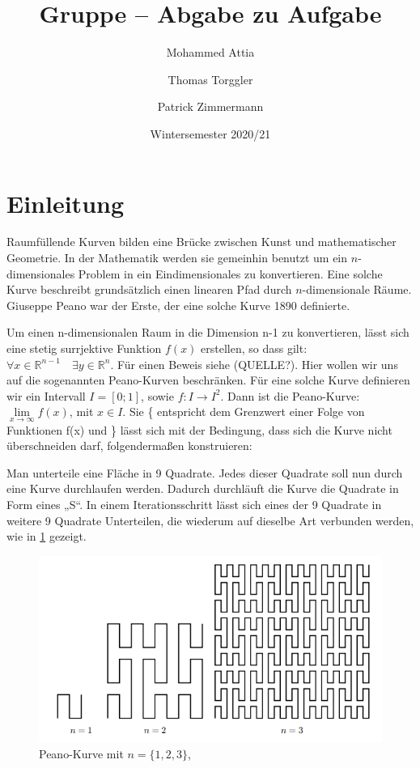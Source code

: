 \documentclass[course=asp]{aspdoc}
\author{Mohammed Attia \and Thomas Torggler \and Patrick Zimmermann}
\date{Wintersemester 2020/21} %
\title{Gruppe \theGroup{} -- Abgabe zu Aufgabe \theNumber}
\begin{document}
\maketitle

\newpage
\section{Einleitung} \label{Einleitung}

Raumf\"ullende Kurven bilden eine Br\"ucke zwischen Kunst und mathematischer Geometrie. In der Mathematik werden sie gemeinhin benutzt um ein $n$-dimensionales Problem in ein Eindimensionales zu konvertieren. Eine solche Kurve beschreibt grunds\"atzlich einen linearen Pfad durch $n$-dimensionale R\"aume. Giuseppe Peano war der Erste, der eine solche Kurve 1890 definierte.

Um einen n-dimensionalen Raum in die Dimension n-1 zu konvertieren, l\"asst sich eine stetig surrjektive Funktion $f(x)$ erstellen, so dass gilt: $\forall x \in \mathbb{R}^{n-1} \quad \exists y \in \mathbb{R}^n$. F\"ur einen Beweis siehe (QUELLE?). Hier wollen wir uns auf die sogenannten Peano-Kurven beschr\"anken. F\"ur eine solche Kurve definieren wir ein Intervall $I = [0;1]$, sowie  $f: I \rightarrow I^2 $. Dann ist die Peano-Kurve: $\lim\limits_{x \to \infty}f(x)$, mit $x \in I$. Sie \{ entspricht dem Grenzwert einer Folge von Funktionen f(x) und \} l\"asst sich mit der Bedingung, dass sich die Kurve nicht \"uberschneiden darf, folgendermaßen konstruieren:

Man unterteile eine Fl\"ache in 9 Quadrate. Jedes dieser Quadrate soll nun durch eine Kurve durchlaufen werden. Dadurch durchl\"auft die Kurve die Quadrate in Form eines „S“.
In einem Iterationsschritt l\"asst sich eines der 9 Quadrate in weitere 9 Quadrate Unterteilen, die wiederum auf dieselbe Art verbunden werden, wie in \ref{Abb:Peano} gezeigt.

\begin{figure} [ht] %
\centering
\includegraphics[scale=0.9]{PeanoBsp.png}
\caption{Peano-Kurve mit $n = \{1, 2, 3\}$, ~\cite{aufgabenstellung}}\label{Abb:Peano}
\end{figure}
\end{document}
